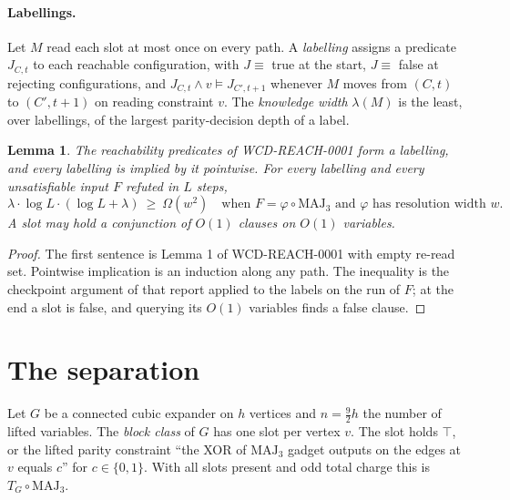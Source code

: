 \documentclass[11pt]{article}
\newtheorem{lemma}[theorem]{Lemma}
\begin{document}
\paragraph{Labellings.} Let $M$ read each slot at most once on every path. A \emph{labelling} assigns a predicate $J_{C,t}$ to each reachable configuration, with $J\equiv$ true at the start, $J\equiv$ false at rejecting configurations, and $J_{C,t}\wedge v\models J_{C',t+1}$ whenever $M$ moves from $(C,t)$ to $(C',t+1)$ on reading constraint $v$. The \emph{knowledge width} $\lambda(M)$ is the least, over labellings, of the largest parity-decision depth of a label.

\begin{lemma}\label{lem:lab}
The reachability predicates of WCD-REACH-0001 form a labelling, and every labelling is implied by it pointwise. For every labelling and every unsatisfiable input $F$ refuted in $L$ steps,
\[\lambda\cdot\log L\cdot(\log L+\lambda)\ \ge\ \Omega(w^2)\quad\text{when }F=\varphi\circ\mathrm{MAJ}_3\text{ and }\varphi\text{ has resolution width }w.\]
A slot may hold a conjunction of $O(1)$ clauses on $O(1)$ variables.
\end{lemma}
\begin{proof}
The first sentence is Lemma 1 of WCD-REACH-0001 with empty re-read set. Pointwise implication is an induction along any path. The inequality is the checkpoint argument of that report applied to the labels on the run of $F$; at the end a slot is false, and querying its $O(1)$ variables finds a false clause.
\end{proof}

\section{The separation}
Let $G$ be a connected cubic expander on $h$ vertices and $n=\tfrac92h$ the number of lifted variables. The \emph{block class} of $G$ has one slot per vertex $v$. The slot holds $\top$, or the lifted parity constraint ``the XOR of $\mathrm{MAJ}_3$ gadget outputs on the edges at $v$ equals $c$'' for $c\in\{0,1\}$. With all slots present and odd total charge this is $T_G\circ\mathrm{MAJ}_3$.
\end{document}
